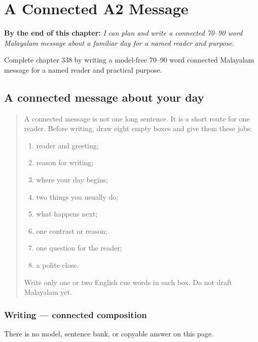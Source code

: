 
\chapter{A Connected A2 Message}
\label{ch:ml-connected-a2-message}

\begin{chapteropening}
\textbf{By the end of this chapter:} \emph{I can plan and write a connected 70–90 word Malayalam message about a familiar day for a named reader and purpose.}

Complete chapter 338 by writing a model-free 70–90 word connected Malayalam message for a named reader and practical purpose.
\end{chapteropening}

\section[(connected A2 writing)]{A connected message about your day}

\label{lesson:ML-W338-a2-connected-composition}



\begin{quote}
A connected message is not one long sentence. It is a short route for one reader. Before writing, draw eight empty boxes and give them these jobs:

\begin{enumerate}
\raggedright
  \item reader and greeting;
  \item reason for writing;
  \item where your day begins;
  \item two things you usually do;
  \item what happens next;
  \item one contrast or reason;
  \item one question for the reader;
  \item a polite close.
\end{enumerate}

Write only one or two English cue words in each box. Do not draft Malayalam yet.
\end{quote}

\subsection*{Writing — connected composition}
There is no model, sentence bank, or copyable answer on this page.

